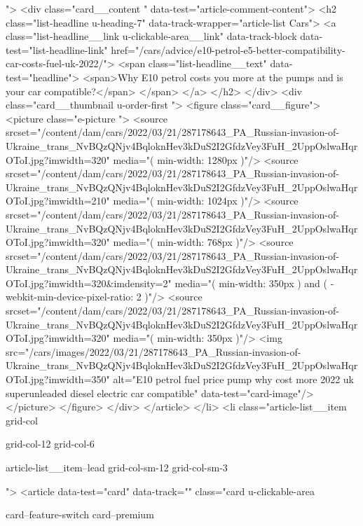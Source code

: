 {{{			
			 ">
<div class="card__content " data-test="article-comment-content">
<h2 class="list-headline  u-heading-7" data-track-wrapper="article-list Cars">
<a class="list-headline__link u-clickable-area__link" data-track-block data-test="list-headline-link" href="/cars/advice/e10-petrol-e5-better-compatibility-car-costs-fuel-uk-2022/">
<span class="list-headline__text" data-test="headline">
<span>Why E10 petrol costs you more at the pumps and is your car compatible?</span>
</span>
</a>
</h2>
</div>
<div class="card__thumbnail u-order-first ">
<figure class="card__figure">
<picture class="e-picture   ">
<source srcset="/content/dam/cars/2022/03/21/287178643_PA_Russian-invasion-of-Ukraine_trans_NvBQzQNjv4BqloknHev3kDuS2I2GfdzVey3FuH_2UppOslwaHqrOToI.jpg?imwidth=320" media="( min-width: 1280px )"/>
<source srcset="/content/dam/cars/2022/03/21/287178643_PA_Russian-invasion-of-Ukraine_trans_NvBQzQNjv4BqloknHev3kDuS2I2GfdzVey3FuH_2UppOslwaHqrOToI.jpg?imwidth=210" media="( min-width: 1024px )"/>
<source srcset="/content/dam/cars/2022/03/21/287178643_PA_Russian-invasion-of-Ukraine_trans_NvBQzQNjv4BqloknHev3kDuS2I2GfdzVey3FuH_2UppOslwaHqrOToI.jpg?imwidth=320" media="( min-width: 768px )"/>
<source srcset="/content/dam/cars/2022/03/21/287178643_PA_Russian-invasion-of-Ukraine_trans_NvBQzQNjv4BqloknHev3kDuS2I2GfdzVey3FuH_2UppOslwaHqrOToI.jpg?imwidth=320&imdensity=2" media="( min-width: 350px ) and ( -webkit-min-device-pixel-ratio: 2 )"/>
<source srcset="/content/dam/cars/2022/03/21/287178643_PA_Russian-invasion-of-Ukraine_trans_NvBQzQNjv4BqloknHev3kDuS2I2GfdzVey3FuH_2UppOslwaHqrOToI.jpg?imwidth=320" media="( min-width: 350px )"/>
<img src="/cars/images/2022/03/21/287178643_PA_Russian-invasion-of-Ukraine_trans_NvBQzQNjv4BqloknHev3kDuS2I2GfdzVey3FuH_2UppOslwaHqrOToI.jpg?imwidth=350" alt="E10 petrol fuel price pump why cost more 2022 uk superunleaded diesel electric car compatible" data-test="card-image"/>
</picture>
</figure>
</div>
</article>
</li>
<li class="article-list__item
				grid-col
				
				
				
				grid-col-12
				grid-col-6
				
				
				
				
				article-list__item--lead grid-col-sm-12
				grid-col-sm-3
				
				
				">
<article data-test="card" data-track="" class="card
			u-clickable-area
			
			card--feature-switch
			card--premium
			
			
			
}}}

